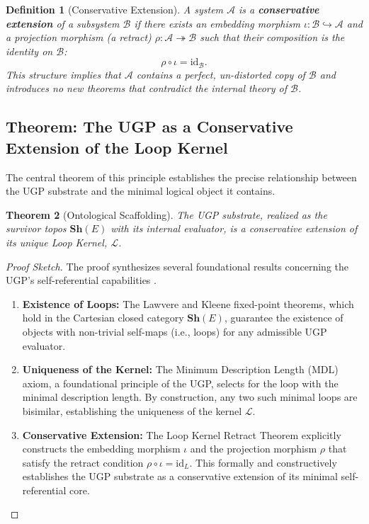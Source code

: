 \documentclass[12pt]{article}
\newtheorem{theorem}{Theorem}[section]
\newtheorem{definition}[theorem]{Definition}
\newcommand{\UWCA}{\text{UWCA}}
\newcommand{\scL}{\mathscr{L}}
\begin{document}
\begin{definition}[Conservative Extension]
\label{def:conservative_extension}
A system $\mathcal{A}$ is a \textbf{conservative extension} of a subsystem $\mathcal{B}$ if there exists an embedding morphism $\iota: \mathcal{B} \hookrightarrow \mathcal{A}$ and a projection morphism (a retract) $\rho: \mathcal{A} \twoheadrightarrow \mathcal{B}$ such that their composition is the identity on $\mathcal{B}$:
\begin{equation}
    \rho \circ \iota = \mathrm{id}_{\mathcal{B}}.
\end{equation}
This structure implies that $\mathcal{A}$ contains a perfect, un-distorted copy of $\mathcal{B}$ and introduces no new theorems that contradict the internal theory of $\mathcal{B}$.
\end{definition}

\subsection{Theorem: The UGP as a Conservative Extension of the Loop Kernel}
The central theorem of this principle establishes the precise relationship between the UGP substrate and the minimal logical object it contains.

\begin{theorem}[Ontological Scaffolding]
\label{thm:ontological_scaffolding}
The UGP substrate, realized as the survivor topos $\mathbf{Sh}(E)$ with its internal \UWCA evaluator, is a conservative extension of its unique Loop Kernel, $\scL$.
\end{theorem}
\begin{proof}[Proof Sketch]
The proof synthesizes several foundational results concerning the UGP's self-referential capabilities \cite{Spivack2025UGP}.
\begin{enumerate}[leftmargin=*, itemsep=0.2em]
    \item \textbf{Existence of Loops:} The Lawvere and Kleene fixed-point theorems, which hold in the Cartesian closed category $\mathbf{Sh}(E)$, guarantee the existence of objects with non-trivial self-maps (i.e., loops) for any admissible UGP evaluator.
    \item \textbf{Uniqueness of the Kernel:} The Minimum Description Length (MDL) axiom, a foundational principle of the UGP, selects for the loop with the minimal description length. By construction, any two such minimal loops are bisimilar, establishing the uniqueness of the kernel $\scL$.
    \item \textbf{Conservative Extension:} The Loop Kernel Retract Theorem explicitly constructs the embedding morphism $\iota$ and the projection morphism $\rho$ that satisfy the retract condition $\rho \circ \iota = \mathrm{id}_{L}$. This formally and constructively establishes the UGP substrate as a conservative extension of its minimal self-referential core. \qedhere
\end{enumerate}
\end{proof}
\end{document}
